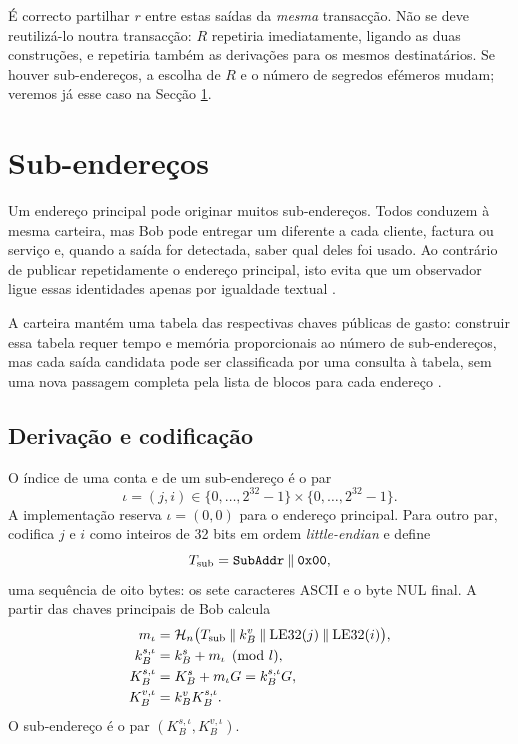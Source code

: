 É correcto partilhar \(r\) entre estas saídas da \emph{mesma} transacção. Não
se deve reutilizá-lo noutra transacção: \(R\) repetiria imediatamente, ligando
as duas construções, e repetiria também as derivações para os mesmos
destinatários. Se houver sub-endereços, a escolha de \(R\) e o número de
segredos efémeros mudam; veremos já esse caso na Secção
\ref{sec:subaddresses}.



\section{Sub-endereços}
\label{sec:subaddresses}

Um endereço principal pode originar muitos sub-endereços. Todos conduzem à
mesma carteira, mas Bob pode entregar um diferente a cada cliente, factura ou
serviço e, quando a saída for detectada, saber qual deles foi usado. Ao
contrário de publicar repetidamente o endereço principal, isto evita que um
observador ligue essas identidades apenas por igualdade textual
\cite{MRL-0006-subaddresses}.

A carteira mantém uma tabela das respectivas
chaves públicas de gasto: construir essa tabela requer tempo e memória
proporcionais ao número de sub-endereços, mas cada saída candidata pode ser
classificada por uma consulta à tabela, sem uma nova passagem completa pela
lista de blocos para cada endereço \cite{subaddress-pull-request}.

\subsection*{Derivação e codificação}

O índice de uma conta e de um sub-endereço é o par
\[
 \iota=(j,i)\in
 \{0,\ldots,2^{32}-1\}\times\{0,\ldots,2^{32}-1\}.
\]
A implementação reserva \(\iota=(0,0)\) para o endereço principal. Para outro
par, codifica \(j\) e \(i\) como inteiros de 32 bits em ordem
\emph{little-endian} e define
\[
 T_{\rm sub}=\texttt{SubAddr}\mathbin\|\texttt{0x00},
\]
uma sequência de oito bytes: os sete caracteres ASCII e o byte NUL final.
%
A partir das chaves principais de Bob calcula
\begin{align*}
 m_\iota&=\mathcal H_n\bigl(
   T_{\rm sub}\mathbin\|k_B^v\mathbin\|
   \operatorname{LE32}(j)\mathbin\|\operatorname{LE32}(i)\bigr),\\
 k_B^{s,\iota}&=k_B^s+m_\iota\pmod l,\\
 K_B^{s,\iota}&=K_B^s+m_\iota G
                =k_B^{s,\iota}G,\\
 K_B^{v,\iota}&=k_B^vK_B^{s,\iota}.
\end{align*}
O sub-endereço é o par
\((K_B^{s,\iota},K_B^{v,\iota})\).


